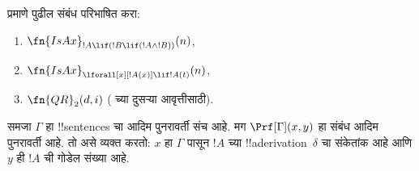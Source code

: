 \documentclass[../../../include/open-logic-section]{subfiles}
\begin{document}
\begin{prob}
 प्रमाणे पुढील संबंध
परिभाषित करा:
\begin{enumerate}
\item $\fn{IsAx}_{!A \lif (!B \lif (!A \land !B))}(n)$,
\item $\fn{IsAx}_{\lforall[x][!A(x)] \lif !A(t)}(n)$,
\item $\fn{QR}_{2}(d, i)$ (\QR{} च्या दुसऱ्या आवृत्तीसाठी).
\end{enumerate}
\end{prob}

\begin{prop}
समजा $\Gamma$ हा !!{sentence}s चा आदिम पुनरावर्ती संच आहे.
मग $\Prf[\Gamma](x, y)$ हा संबंध आदिम पुनरावर्ती आहे.
तो असे व्यक्त करतो: $x$ हा $\Gamma$ पासून $!A$ च्या
!!a{derivation}~$\delta$ चा संकेतांक आहे आणि $y$ ही
$!A$ ची गोडेल संख्या आहे.
\end{prop}
\end{document}
